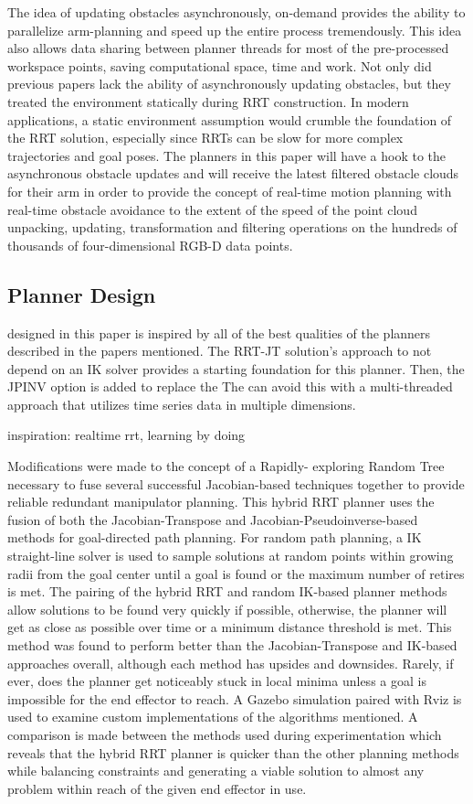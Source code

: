 \documentclass[conference]{IEEEtran} \usepackage[T1]{fontenc} \usepackage[backend=biber, style=ieee]{biblatex}
\begin{document}
The idea of updating obstacles asynchronously, on-demand provides the ability to parallelize arm-planning and speed up the entire process tremendously. This idea also 
allows data sharing between planner threads for most of the pre-processed workspace points, saving computational space, time and work. Not only did previous papers lack 
the ability of asynchronously updating obstacles, but they treated the environment statically during RRT construction. In modern applications, a static environment
assumption would crumble the foundation of the RRT solution, especially since RRTs can be slow for more complex trajectories and goal poses. The planners in this paper 
will have a hook to the asynchronous obstacle updates and will receive the latest filtered obstacle clouds for their arm in order to provide the concept of real-time 
motion planning with real-time obstacle avoidance to the extent of the speed of the point cloud unpacking, updating, transformation and filtering operations on the 
hundreds of thousands of four-dimensional RGB-D data points.
 
\subsection{Planner Design}


designed in this paper is inspired by all of the best qualities of the planners described in the papers mentioned. The RRT-JT solution's approach to not
depend on an IK solver provides a starting foundation for this planner. Then, the JPINV option is added to replace the 
The can avoid this with a multi-threaded approach that utilizes time series data in multiple dimensions.

inspiration: realtime rrt, learning by doing

Modifications were made to the concept of a Rapidly-
exploring Random Tree necessary to fuse several successful Jacobian-based techniques together to provide reliable redundant manipulator planning. This hybrid 
RRT planner uses the fusion of both the Jacobian-Transpose and Jacobian-Pseudoinverse-based methods for goal-directed path planning. For random path planning, a IK
straight-line solver is used to sample solutions at random points within growing radii from the goal center until a goal is found or the maximum number of retires is met. 
The pairing of the hybrid RRT and random IK-based planner methods allow solutions to be found very quickly if possible, otherwise, the planner will get as close as 
possible over time or a minimum distance threshold is met. This method was found to perform better than the Jacobian-Transpose and IK-based approaches overall, although 
each method has upsides and downsides. Rarely, if ever, does the planner get noticeably stuck in local minima unless a goal is impossible for the end effector to 
reach. A Gazebo simulation paired with Rviz is used to examine custom implementations of the algorithms mentioned. A comparison is made between the methods used 
during experimentation which reveals that the hybrid RRT planner is quicker than the other planning methods while balancing constraints and generating a viable solution to 
almost any problem within reach of the given end effector in use.
\end{document}

